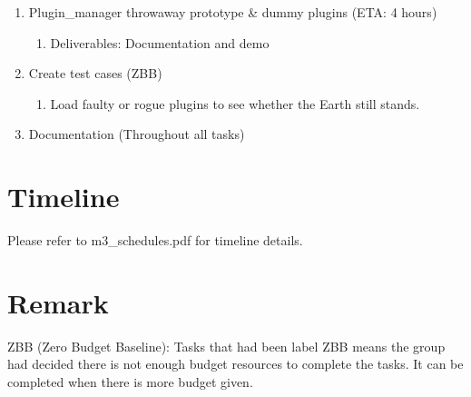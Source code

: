 \documentclass{article}
\begin{document}
\begin{enumerate}
	\item Plugin\_manager throwaway prototype \& dummy plugins (ETA: 4 hours)
		\begin{enumerate}
			\item Deliverables: Documentation and demo
		\end{enumerate}
	\item Create test cases (ZBB)
		\begin{enumerate}
			\item Load faulty or rogue plugins to see whether the Earth still stands.
		\end{enumerate}
	\item Documentation (Throughout all tasks)
\end{enumerate}

\section{Timeline}

Please refer to m3\_schedules.pdf for timeline details. 

\section*{Remark}

ZBB (Zero Budget Baseline): Tasks that had been label ZBB means the group had decided there is not enough budget resources to complete the tasks. It can be completed when there is more budget given. 
\end{document}
